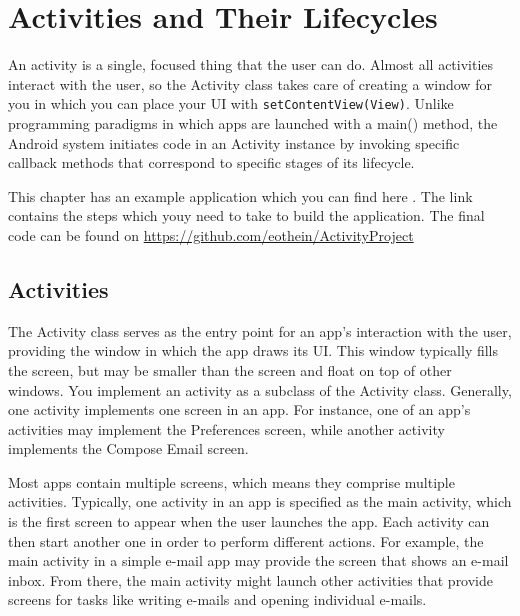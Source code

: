 

\chapter{Activities and Their Lifecycles}
An activity is a single, focused thing that the user can do.
Almost all activities interact with the user, so the Activity class takes care of creating a window for you in which you can place your UI with \texttt{setContentView(View)}. 
Unlike programming paradigms in which apps are launched with a main() method, the Android system initiates code in an Activity instance by invoking specific callback methods that correspond to specific stages of its lifecycle.
	
\begin{framed}
	This chapter has an example application which you can find here \cite{GoogleDevelopers2018}.
	The link contains the steps which youy need to take to build the application.
	The final code can be found on \url{https://github.com/eothein/ActivityProject}	
\end{framed}

\section{Activities}
The Activity class serves as the entry point for an app’s interaction with the user, providing the window in which the app draws its UI.
This window typically fills the screen, but may be smaller than the screen and float on top of other windows.
You implement an activity as a subclass of the Activity class.
Generally, one activity implements one screen in an app.
For instance, one of an app’s activities may implement the Preferences screen, while another activity implements the Compose Email screen.

Most apps contain multiple screens, which means they comprise multiple activities.
Typically, one activity in an app is specified as the main activity, which is the first screen to appear when the user launches the app.
Each activity can then start another one in order to perform different actions.
For example, the main activity in a simple e-mail app may provide the screen that shows an e-mail inbox.
From there, the main activity might launch other activities that provide screens for tasks like writing e-mails and opening individual e-mails.

